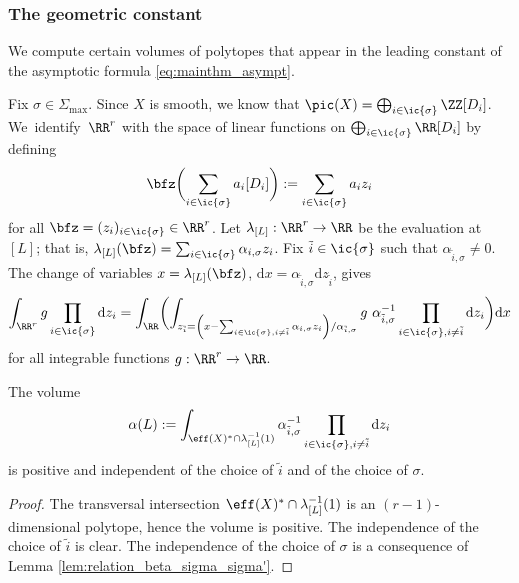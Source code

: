\subsubsection{The geometric constant}
We compute certain volumes of polytopes that appear in the leading constant
of the asymptotic formula \eqref{eq:mainthm_asympt}.

Fix $\sigma\in\Sigma_{\max}$.
Since $X$ is smooth, we know that $\pic(X)=\bigoplus_{i\in\ic{\sigma}}\ZZ[D_i]$.
We~iden\-ti\-fy~$\RR^r$ with the space of linear functions on
$\bigoplus_{i\in\ic{\sigma}}\RR[D_{i}]$ by defining
\[
\bfz\biggl (\sum_{i\in\ic{\sigma}}a_i[D_{i}]\biggr):=\sum_{i\in\ic{\sigma}}a_iz_i
\]
for all $\bfz=(z_i)_{i\in\ic{\sigma}}\in\RR^r$.
Let $\lambda_{[L]}:\RR^r\to\RR$ be the evaluation at $[L]$;
that is, $\lambda_{[L]}(\bfz)=\sum_{i\in\ic{\sigma}}\alpha_{i,\sigma} z_i$.
Fix $\tilde i\in\ic{\sigma}$ such that $\alpha_{\tilde i,\sigma}\neq0$.
The change of variables $x=\lambda_{[L]}(\bfz)$,
$\mathrm d x=\alpha_{\tilde i,\sigma}\mathrm d z_{\tilde i}$, gives
\[
\int_{\RR^r} g\prod_{i\in\ic{\sigma}}\mathrm d z_i=
\int_\RR\biggl (
\int_{z_{\tilde i}=\left (x-\sum_{i\in\ic{\sigma}, i\neq\tilde i}\alpha_{i,\sigma} z_i \right)/\alpha_{\tilde i,\sigma}}
g\ \alpha_{\tilde i,\sigma}^{-1}\prod_{i\in\ic{\sigma}, i\neq\tilde i}\mathrm dz_i\biggr)\mathrm d x
\]
for all integrable functions $g:\RR^r\to \RR$.
\begin{lemma}
\label{lem:alpha_peyre}
The volume
\[
\alpha(L):=
\int_{\eff(X)^*\cap \lambda_{[L]}^{-1}(1)}
\alpha_{\tilde i,\sigma}^{-1}\prod_{i\in \ic{\sigma}, i\neq\tilde i}\mathrm dz_i
\]
is positive and independent of the choice of $\tilde i$ and of the choice of $\sigma$.
\end{lemma}
\begin{proof}
The transversal intersection $\eff(X)^*\cap \lambda_{[L]}^{-1}(1)$
is an $(r-1)$-dimensional polytope, hence the volume is positive.
The independence of the choice of $\tilde i$ is clear.
The independence of the choice of $\sigma$ is a consequence of
Lemma \ref{lem:relation_beta_sigma_sigma'}.
\end{proof}

